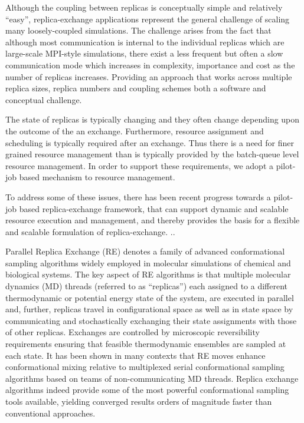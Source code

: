 \documentclass{sig-alternate}
\begin{document}
Although the coupling between replicas is conceptually simple and
relatively ``easy'', replica-exchange applications represent the
general challenge of scaling many loosely-coupled simulations. The
challenge arises from the fact that although most communication is
internal to the individual replicas which are large-scale MPI-style
simulations, there exist a less frequent but often a slow
communication mode which increases in complexity, importance and cost
as the number of replicas increases. Providing an approach that works
across multiple replica sizes, replica numbers and coupling schemes
both a software and conceptual challenge.


The state of replicas is typically changing and they often change
depending upon the outcome of the an exchange. Furthermore, resource
assignment and scheduling is typically required after an exchange.
Thus there is a need for finer grained resource management than is
typically provided by the batch-queue level resource management.  In
order to support these requirements, we adopt a pilot-job based
mechanism to resource management.
 

To address some of these issues, there has been recent progress
towards a pilot-job based replica-exchange framework, that can support
dynamic and scalable resource execution and management, and thereby
provides the basis for a flexible and scalable formulation of
replica-exchange. ..


Parallel Replica Exchange (RE)\cite{hansmann1999new,Felts:Harano:Gallicchio:Levy:2004,Andrec2005,Mitsutake2010} denotes a family of advanced
conformational sampling algorithms widely employed in molecular
simulations of chemical and biological systems. The key aspect of RE
algorithms is that multiple molecular dynamics (MD) threads (referred
to as “replicas”) each assigned to a different thermodynamic or
potential energy state of the system, are executed in parallel and, further,
replicas travel in configurational space as well as in state
space by communicating and stochastically exchanging their state
assignments with those of other replicas. Exchanges are controlled by
microscopic reversibility requirements ensuring that feasible
thermodynamic ensembles are sampled at each state.  It has been shown
in many contexts\cite{Woods2003,Murata2004,Bussi2006,Liu2006,Yeh2008,Meng2010,Gallicchio2011} that RE moves enhance
conformational mixing relative to multiplexed serial conformational
sampling algorithms based on teams of non-communicating
MD threads. Replica exchange algorithms indeed provide some of the
most powerful conformational sampling tools available, yielding
converged results orders of magnitude faster than
conventional approaches.
\end{document}
